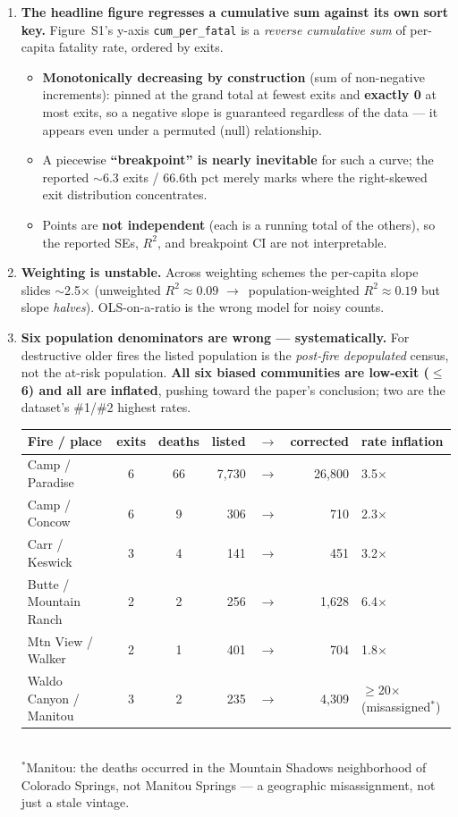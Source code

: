 \documentclass[9pt]{extarticle}
\newcommand{\rr}{$\rightarrow$}
\begin{document}
\begin{enumerate}
\item \textbf{The headline figure regresses a cumulative sum against its own sort key.} Figure~S1's
y-axis \texttt{cum\_per\_fatal} is a \emph{reverse cumulative sum} of per-capita fatality rate, ordered by exits.
  \begin{itemize}
  \item \textbf{Monotonically decreasing by construction} (sum of non-negative increments): pinned at the grand total at fewest exits and \textbf{exactly 0} at most exits, so a negative slope is guaranteed regardless of the data --- it appears even under a permuted (null) relationship.
  \item A piecewise \textbf{``breakpoint'' is nearly inevitable} for such a curve; the reported $\sim$6.3 exits / 66.6th pct merely marks where the right-skewed exit distribution concentrates.
  \item Points are \textbf{not independent} (each is a running total of the others), so the reported SEs, $R^2$, and breakpoint CI are not interpretable.
  \end{itemize}
\item \textbf{Weighting is unstable.} Across weighting schemes the per-capita slope slides $\sim$2.5$\times$ (unweighted $R^2\!\approx\!0.09$ \rr\ population-weighted $R^2\!\approx\!0.19$ but slope \emph{halves}). OLS-on-a-ratio is the wrong model for noisy counts.
\item \textbf{Six population denominators are wrong --- systematically.} For destructive older fires the listed population is the \emph{post-fire depopulated} census, not the at-risk population. \textbf{All six biased communities are low-exit ($\leq$6) and all are inflated}, pushing toward the paper's conclusion; two are the dataset's \#1/\#2 highest rates.

\vspace{2pt}
{\footnotesize
\begin{tabular}{@{}lccr@{\,}c@{\,}rl@{}}
\toprule
Fire / place & exits & deaths & listed & \rr & corrected & rate inflation\\
\midrule
Camp / Paradise        & 6 & 66 & 7{,}730 & \rr & 26{,}800 & 3.5$\times$\\
Camp / Concow          & 6 & 9  & 306     & \rr & 710      & 2.3$\times$\\
Carr / Keswick         & 3 & 4  & 141     & \rr & 451      & 3.2$\times$\\
Butte / Mountain Ranch & 2 & 2  & 256     & \rr & 1{,}628  & 6.4$\times$\\
Mtn View / Walker      & 2 & 1  & 401     & \rr & 704      & 1.8$\times$\\
Waldo Canyon / Manitou & 3 & 2  & 235     & \rr & 4{,}309  & $\geq$20$\times$ (misassigned$^\ast$)\\
\bottomrule
\end{tabular}}
\\[2pt]
{\footnotesize $^\ast$Manitou: the deaths occurred in the Mountain Shadows neighborhood of Colorado Springs, not Manitou Springs --- a geographic misassignment, not just a stale vintage.}
\end{enumerate}
\end{document}
